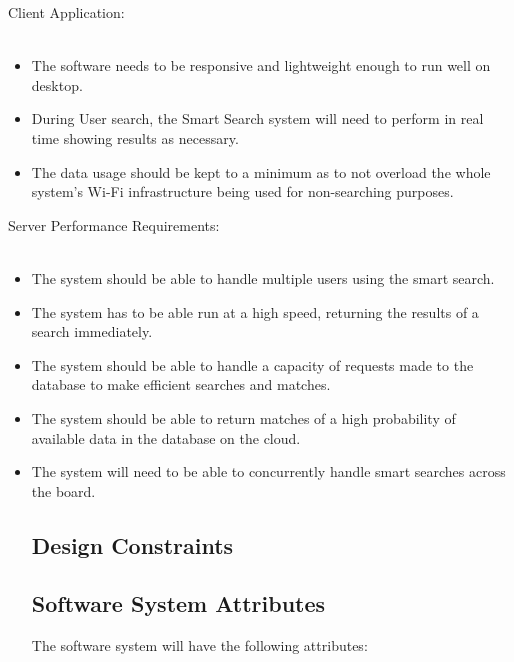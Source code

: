 \documentclass[a4paper,10pt]{article}
\begin{document}
{	\item Client Application:\\\\
		\begin{itemize}
		\item The software needs to be responsive and lightweight enough to run well on desktop.\\
		\item During User search, the Smart Search system will need to perform in real time showing results as necessary.\\
		\item The data usage should be kept to a minimum as to not overload the whole system's Wi-Fi infrastructure being used for non-searching purposes.\\
		\end{itemize}
	
	\item Server Performance Requirements:\\\\
		\begin{itemize}
		\item The system should be able to handle multiple users using the smart search.\\
		\item The system has to be able run at a high speed, returning the results of a search immediately.\\
		\item The system should be able to handle a capacity of requests made to the database to make efficient searches and matches. \\
		\item The system should be able to return matches of a high probability of available data in the database on the cloud.\\
		\item The system will need to be able to concurrently handle smart searches across the board.
		
	\subsection{Design Constraints}

	\subsection{Software System Attributes}
	The software system will have the following attributes:
		

\end{itemize}}
\end{document}
